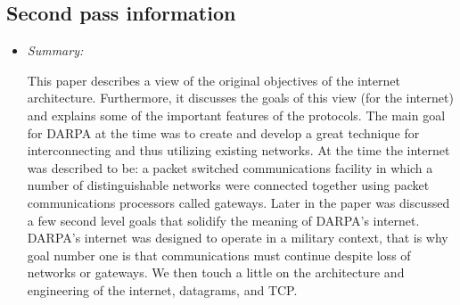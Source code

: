 \documentclass[letterpaper,twocolumn,10pt]{article}
\begin{document}
\subsection{Second pass information}
\label{sec:second}

\begin{itemize}

\item {\it Summary:} 

This paper describes a view of the original objectives of the internet architecture. Furthermore, it 
discusses the goals of this view (for the internet) and explains some of the important features of the 
protocols. The main goal for DARPA at the time was to create and develop a great technique for 
interconnecting and thus utilizing existing networks. At the time the internet was described to be: a
packet switched communications facility in which a number of distinguishable networks were connected
together using packet communications processors called gateways. Later in the paper was discussed a few second level goals that solidify the meaning of
DARPA's internet. DARPA's internet was designed to operate in a military context, that is why goal
number one is that communications must continue despite loss of networks or gateways. We then
touch a little on the architecture and engineering of the internet, datagrams, and TCP.

\end{itemize}
\end{document}
